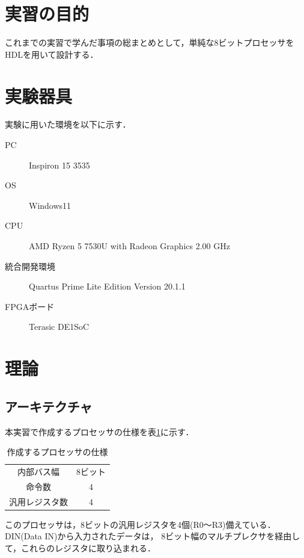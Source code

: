 \documentclass{jlreq}
\numberwithin{equation}{section}
\begin{document}
\tableofcontents
\clearpage

\section{実習の目的}
これまでの実習で学んだ事項の総まとめとして，単純な8ビットプロセッサをHDLを用いて設計する．

\section{実験器具}
実験に用いた環境を以下に示す．
\begin{description}
	\item[PC] Inspiron 15 3535
	\item[OS] Windows11
	\item[CPU] AMD Ryzen 5 7530U with Radeon Graphics 2.00 GHz
	\item[統合開発環境] Quartus Prime Lite Edition Version 20.1.1
	\item[FPGAボード] Terasic DE1SoC
\end{description}

\section{理論}
\subsection{アーキテクチャ}
本実習で作成するプロセッサの仕様を表\ref{tab:processor_spec}に示す．
\begin{table}[H]
	\centering
	\caption{作成するプロセッサの仕様}
	\begin{tabular}{c|c}
		\hline
		内部バス幅     & 8ビット \\
		命令数         & 4       \\
		汎用レジスタ数 & 4       \\ \hline
	\end{tabular}
	\label{tab:processor_spec}
\end{table}
このプロセッサは，8ビットの汎用レジスタを4個(R0～R3)備えている．DIN(Data IN)から入力されたデータは，
8ビット幅のマルチプレクサを経由して，これらのレジスタに取り込まれる．
\end{document}
